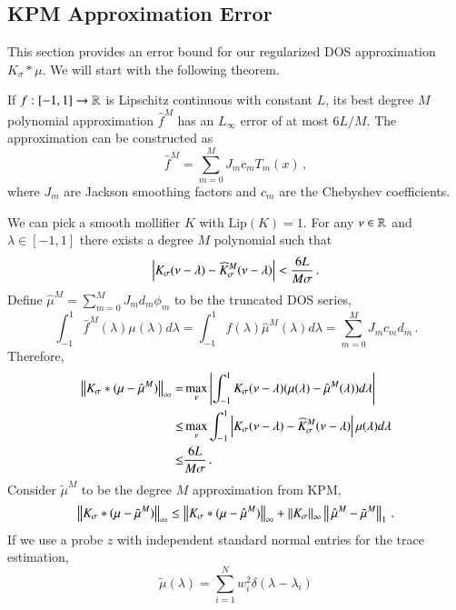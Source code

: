 \subsection{KPM Approximation Error}
This section provides an error bound for our regularized DOS approximation
$K_\sigma\ast\mu$. We will start with the following theorem.
\begin{theorem}
\label{thm:Jackson_damping}
	If $f:[-1,1]\rightarrow \mathbb{R}$ is Lipschitz continuous with constant $L$, its
	best degree $M$ polynomial approximation $\hat{f}^M$ has an $L_\infty$ 
	error of at most $6L/M$. The approximation can be constructed as
	\begin{equation}
		\hat{f}^M = \sum_{m=0}^MJ_mc_mT_m(x)\,,
	\end{equation}
	where $J_m$ are Jackson smoothing factors and $c_m$ are the Chebyshev
	coefficients.
\end{theorem}
We can pick a smooth mollifier $K$ with $\text{Lip}(K)=1$. For any $\nu\in\mathbb{R}$
and $\lambda\in [-1,1]$ there exists a degree $M$ polynomial such that 
\begin{equation}
	\left\lvert K_\sigma(\nu-\lambda)-\widehat{K}^{M}_\sigma(\nu-\lambda)\right\rvert < \frac{6L}
	{M\sigma}\,.
\end{equation}
Define $\hat{\mu}^M = \sum_{m=0}^MJ_md_m\phi_m$ to be the truncated DOS
series,
\begin{equation}
	\int_{-1}^1 \hat{f}^M(\lambda)\mu(\lambda)d\lambda = \int_{-1}^1f
	(\lambda)\hat{\mu}^M(\lambda)d\lambda = \sum_{m=0}^MJ_mc_md_m\,.
\end{equation}
Therefore,
\begin{align*}
	\left\lVert K_\sigma\ast(\mu-\hat{\mu}^M)\right\rVert_\infty
	=& \max_\nu\left\lvert\int_{-1}^1K_\sigma(\nu-\lambda)(\mu(\lambda)-\hat{\mu}^M 
	(\lambda))d\lambda\right\rvert\\
	\leq& \max_\nu\int_{-1}^1\left\lvert K_\sigma(\nu-\lambda)-\widehat{K}^M_\sigma
	(\nu-\lambda)\right\rvert\mu(\lambda)d\lambda \\
	\leq& \frac{6L}{M\sigma}\,.
\end{align*}
Consider $\tilde{\mu}^M$ to be the degree $M$ approximation from KPM,
\begin{equation}
	\left\lVert K_\sigma\ast(\mu-\tilde{\mu}^M)\right\rVert_\infty \leq \left\lVert K_\sigma\ast(\mu- 
	\hat{\mu}^M)\right\rVert_\infty+ \left\lVert K_\sigma\right\rVert_\infty\left\lVert\,\hat{\mu}^M - 
	\tilde{\mu}^M\right\rVert_1\,.
\end{equation}
If we use a probe $z$ with independent standard normal entries for the
trace estimation,
\begin{equation}
	\tilde{\mu}(\lambda) = \sum_{i=1}^Nw_i^2\delta(\lambda-\lambda_i)
\end{equation}
